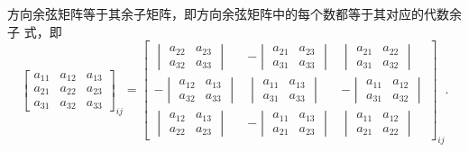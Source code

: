 \begin{property}[性质三]\label{prop:dcm-cofactor}
	方向余弦矩阵等于其余子矩阵，即方向余弦矩阵中的每个数都等于其对应的代数余子
	式，即
	$$\begin{bmatrix}a_{11}&a_{12}&a_{13}\\a_{21}&a_{22}&a_{23}\\a_{31}&a_{32}&a_{33}\end{bmatrix}_{ij}=\left[\begin{array}{ccc}\begin{vmatrix}a_{22}&a_{23}\\a_{32}&a_{33}\end{vmatrix}&-\begin{vmatrix}a_{21}&a_{23}\\a_{31}&a_{33}\end{vmatrix}&\begin{vmatrix}a_{21}&a_{22}\\a_{31}&a_{32}\end{vmatrix}\\-\begin{vmatrix}a_{12}&a_{13}\\a_{32}&a_{33}\end{vmatrix}&\begin{vmatrix}a_{11}&a_{13}\\a_{31}&a_{33}\end{vmatrix}&-\begin{vmatrix}a_{11}&a_{12}\\a_{31}&a_{32}\end{vmatrix}\\\begin{vmatrix}a_{12}&a_{13}\\a_{22}&a_{23}\end{vmatrix}&-\begin{vmatrix}a_{11}&a_{13}\\a_{21}&a_{23}\end{vmatrix}&\begin{vmatrix}a_{11}&a_{12}\\a_{21}&a_{22}\end{vmatrix}\end{array}\right]_{ij}.$$
\end{property}

